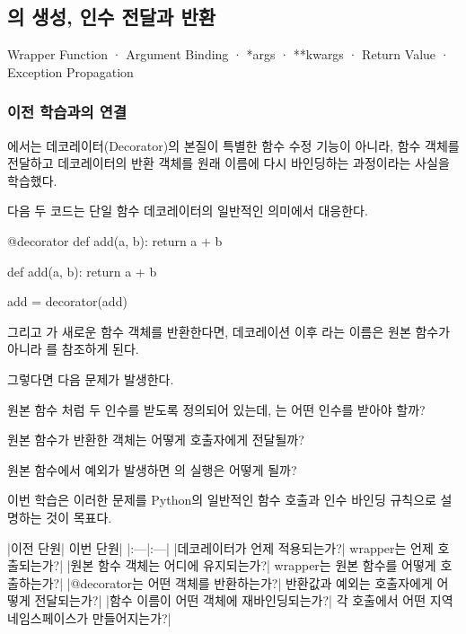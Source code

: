 

\subsection{의 생성, 인수 전달과 반환}

Wrapper Function · Argument Binding · *args · **kwargs · Return Value · Exception Propagation

\subsubsection{이전 학습과의 연결}

에서는 데코레이터(Decorator)의 본질이 특별한 함수 수정 기능이 아니라, 함수 객체를 전달하고 데코레이터의 반환 객체를 원래 이름에 다시 바인딩하는 과정이라는 사실을 학습했다.

다음 두 코드는 단일 함수 데코레이터의 일반적인 의미에서 대응한다.

\begin{dhkcode}
@decorator
def add(a, b):
    return a + b
\end{dhkcode}

\begin{dhkcode}
def add(a, b):
    return a + b

add = decorator(add)
\end{dhkcode}

그리고 가 새로운  함수 객체를 반환한다면, 데코레이션 이후 라는 이름은 원본 함수가 아니라 를 참조하게 된다.

그렇다면 다음 문제가 발생한다.

원본 함수 처럼 두 인수를 받도록 정의되어 있는데, 는 어떤 인수를 받아야 할까?

원본 함수가 반환한 객체는 어떻게 호출자에게 전달될까?

원본 함수에서 예외가 발생하면 의 실행은 어떻게 될까?

이번 학습은 이러한 문제를 Python의 일반적인 함수 호출과 인수 바인딩 규칙으로 설명하는 것이 목표다.

\begin{dhktable}
|이전 단원|	이번 단원|
|:---|:---|
|데코레이터가 언제 적용되는가?|	wrapper는 언제 호출되는가?|
|원본 함수 객체는 어디에 유지되는가?|	wrapper는 원본 함수를 어떻게 호출하는가?|
|@decorator는 어떤 객체를 반환하는가?|	반환값과 예외는 호출자에게 어떻게 전달되는가?|
|함수 이름이 어떤 객체에 재바인딩되는가?|	각 호출에서 어떤 지역 네임스페이스가 만들어지는가?|
\end{dhktable}

